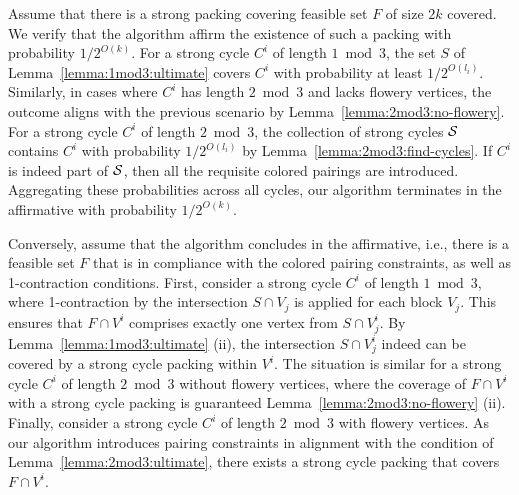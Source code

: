 Assume that there is  a strong packing covering feasible set $F$ of size $2k$ covered.
We verify that the algorithm affirm the existence of such a packing with probability $1/2^{O(k)}$.
For a strong cycle $C^i$ of length $1 \bmod 3$, the set $S$ of Lemma~\ref{lemma:1mod3:ultimate} covers $C^i$ with probability at least $1/2^{O(l_i)}$.
Similarly,  in cases where $C^i$ has length $2 \bmod 3$ and lacks flowery vertices, the outcome aligns with the previous scenario by Lemma~\ref{lemma:2mod3:no-flowery}.
For a strong cycle $C^i$ of length $2 \bmod 3$, the collection of strong cycles $\mathcal S$ contains $C^i$ with probability $1/2^{O(l_i)}$ by Lemma~\ref{lemma:2mod3:find-cycles}.
If $C^i$ is indeed part of $\mathcal S$, then all the requisite colored pairings are introduced.
Aggregating these probabilities across all cycles, our algorithm terminates in the affirmative with probability $1/2^{O(k)}$.

Conversely, assume that the algorithm concludes in the affirmative, i.e., there is a feasible set $F$ that is in compliance with the colored pairing constraints, as well as 1-contraction conditions.
First, consider a strong cycle $C^i$ of length $1 \bmod 3$, where 1-contraction by the intersection $S \cap V_j$ is applied for each block $V_j$.
This ensures that $F \cap V^i$ comprises exactly one vertex from $S \cap V^i_j$.
By Lemma~\ref{lemma:1mod3:ultimate} (ii), the intersection $S \cap V^i_j$ indeed can be covered by a strong cycle packing within $V^i$.
The situation is similar for a strong cycle $C^i$ of length $2 \bmod 3$ without flowery vertices, where the coverage  of $F \cap V^i$ with a strong cycle packing is guaranteed Lemma~\ref{lemma:2mod3:no-flowery} (ii).
Finally, consider a strong cycle $C^i$ of length $2 \bmod 3$ with flowery vertices.
As our algorithm introduces pairing constraints in alignment with the condition of Lemma~\ref{lemma:2mod3:ultimate}, there exists a strong cycle packing that covers $F \cap V^i$.

